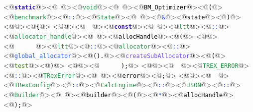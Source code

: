 <@\textcolor[HTML]{3010CF}{\textbf{\texttt{static}}}@><@\textcolor[HTML]{000000}{\texttt{\ }}@><@\textcolor[HTML]{1F8F42}{\texttt{void}}@><@\textcolor[HTML]{000000}{\texttt{\ }}@><@\textcolor[HTML]{000000}{\texttt{BM\_Optimizer}}@><@\textcolor[HTML]{000000}{\texttt{(}}@><@\textcolor[HTML]{1F8F42}{\texttt{benchmark}}@><@\textcolor[HTML]{1041FF}{\texttt{::}}@><@\textcolor[HTML]{1F8F42}{\texttt{State}}@><@\textcolor[HTML]{000000}{\texttt{\ }}@><@\textcolor[HTML]{1041FF}{\texttt{\&}}@><@\textcolor[HTML]{000000}{\texttt{state}}@><@\textcolor[HTML]{000000}{\texttt{)}}@>
<@\textcolor[HTML]{000000}{\texttt{}}@><@\textcolor[HTML]{000000}{\texttt{\{}}@>
<@\textcolor[HTML]{000000}{\texttt{}}@><@\textcolor[HTML]{000000}{\texttt{\ \ }}@><@\textcolor[HTML]{3010CF}{\textbf{\texttt{const}}}@><@\textcolor[HTML]{000000}{\texttt{\ }}@><@\textcolor[HTML]{1F8F42}{\texttt{ltt}}@><@\textcolor[HTML]{1041FF}{\texttt{::}}@><@\textcolor[HTML]{1F8F42}{\texttt{allocator\_handle}}@><@\textcolor[HTML]{000000}{\texttt{\ }}@><@\textcolor[HTML]{000000}{\texttt{allocHandle}}@><@\textcolor[HTML]{000000}{\texttt{(}}@>
<@\textcolor[HTML]{000000}{\texttt{}}@><@\textcolor[HTML]{000000}{\texttt{\ \ \ \ \ \ }}@><@\textcolor[HTML]{1F8F42}{\texttt{ltt}}@><@\textcolor[HTML]{1041FF}{\texttt{::}}@><@\textcolor[HTML]{1F8F42}{\texttt{allocator}}@><@\textcolor[HTML]{1041FF}{\texttt{::}}@><@\textcolor[HTML]{255CFF}{\texttt{global\_allocator}}@><@\textcolor[HTML]{000000}{\texttt{().}}@><@\textcolor[HTML]{724BFF}{\texttt{createSubAllocator}}@><@\textcolor[HTML]{000000}{\texttt{(}}@><@\textcolor[HTML]{418310}{\texttt{\dq{}test\dq{}}}@><@\textcolor[HTML]{000000}{\texttt{)}}@>
<@\textcolor[HTML]{000000}{\texttt{}}@><@\textcolor[HTML]{000000}{\texttt{\ \ \ \ \ \ );}}@>
<@\textcolor[HTML]{000000}{\texttt{}}@><@\textcolor[HTML]{000000}{\texttt{\ \ }}@><@\textcolor[HTML]{1F8F42}{\texttt{TREX\_ERROR}}@><@\textcolor[HTML]{1041FF}{\texttt{::}}@><@\textcolor[HTML]{1F8F42}{\texttt{TRexError}}@><@\textcolor[HTML]{000000}{\texttt{\ }}@><@\textcolor[HTML]{000000}{\texttt{error}}@><@\textcolor[HTML]{000000}{\texttt{;}}@>
<@\textcolor[HTML]{000000}{\texttt{}}@><@\textcolor[HTML]{000000}{\texttt{\ \ }}@><@\textcolor[HTML]{1F8F42}{\texttt{TRexConfig}}@><@\textcolor[HTML]{1041FF}{\texttt{::}}@><@\textcolor[HTML]{1F8F42}{\texttt{CalcEngine}}@><@\textcolor[HTML]{1041FF}{\texttt{::}}@><@\textcolor[HTML]{1F8F42}{\texttt{JSON}}@><@\textcolor[HTML]{1041FF}{\texttt{::}}@><@\textcolor[HTML]{1F8F42}{\texttt{Builder}}@><@\textcolor[HTML]{000000}{\texttt{\ }}@><@\textcolor[HTML]{000000}{\texttt{builder}}@><@\textcolor[HTML]{000000}{\texttt{(}}@><@\textcolor[HTML]{1041FF}{\texttt{*}}@><@\textcolor[HTML]{000000}{\texttt{allocHandle}}@><@\textcolor[HTML]{000000}{\texttt{);}}@>
